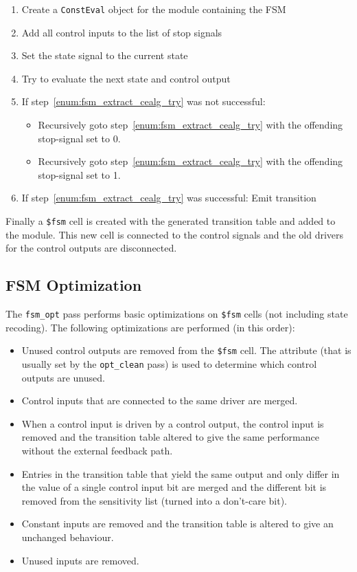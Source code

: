 \begin{enumerate}
\item Create a {\tt ConstEval} object for the module containing the FSM
\item Add all control inputs to the list of stop signals
\item Set the state signal to the current state
\item Try to evaluate the next state and control output \label{enum:fsm_extract_cealg_try}
\item If step~\ref{enum:fsm_extract_cealg_try} was not successful:
\begin{itemize}
\item Recursively goto step~\ref{enum:fsm_extract_cealg_try} with the offending stop-signal set to 0.
\item Recursively goto step~\ref{enum:fsm_extract_cealg_try} with the offending stop-signal set to 1.
\end{itemize}
\item If step~\ref{enum:fsm_extract_cealg_try} was successful: Emit transition
\end{enumerate}

Finally a {\tt \$fsm} cell is created with the generated transition table and added to the
module. This new cell is connected to the control signals and the old drivers for the
control outputs are disconnected.

\subsection{FSM Optimization}

The {\tt fsm\_opt} pass performs basic optimizations on {\tt \$fsm} cells (not including state
recoding). The following optimizations are performed (in this order):

\begin{itemize}
\item Unused control outputs are removed from the {\tt \$fsm} cell. The attribute 
(that is usually set by the {\tt opt\_clean} pass) is used to determine which control
outputs are unused.
\item Control inputs that are connected to the same driver are merged.
\item When a control input is driven by a control output, the control input is removed and the transition
table altered to give the same performance without the external feedback path.
\item Entries in the transition table that yield the same output and only
differ in the value of a single control input bit are merged and the different bit is removed
from the sensitivity list (turned into a don't-care bit).
\item Constant inputs are removed and the transition table is altered to give an unchanged behaviour.
\item Unused inputs are removed.
\end{itemize}

